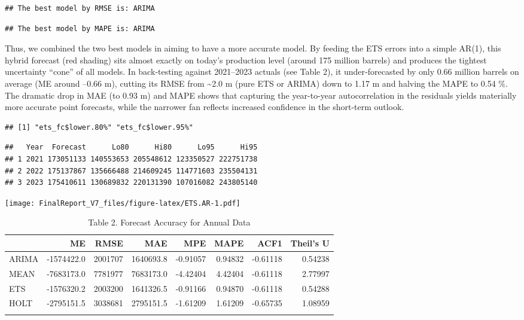 \documentclass[
]{article}
\begin{document}
\begin{verbatim}
## The best model by RMSE is: ARIMA
\end{verbatim}

\begin{verbatim}
## The best model by MAPE is: ARIMA
\end{verbatim}

Thus, we combined the two best models in aiming to have a more accurate
model. By feeding the ETS errors into a simple AR(1), this hybrid
forecast (red shading) sits almost exactly on today's production level
(around 175 million barrels) and produces the tightest uncertainty
``cone'' of all models. In back‐testing against 2021--2023 actuals (see
Table 2), it under‐forecasted by only 0.66 million barrels on average
(ME around --0.66 m), cutting its RMSE from \textasciitilde2.0 m (pure
ETS or ARIMA) down to 1.17 m and halving the MAPE to 0.54 \%. The
dramatic drop in MAE (to 0.93 m) and MAPE shows that capturing the
year-to-year autocorrelation in the residuals yields materially more
accurate point forecasts, while the narrower fan reflects increased
confidence in the short‐term outlook.

\begin{verbatim}
## [1] "ets_fc$lower.80%" "ets_fc$lower.95%"
\end{verbatim}

\begin{verbatim}
##   Year  Forecast      Lo80      Hi80      Lo95      Hi95
## 1 2021 173051133 140553653 205548612 123350527 222751738
## 2 2022 175137867 135666488 214609245 114771603 235504131
## 3 2023 175410611 130689832 220131390 107016082 243805140
\end{verbatim}

\texttt{[image: FinalReport\_V7\_files/figure-latex/ETS.AR-1.pdf]}

\begin{table}
\centering\centering
\caption{\label{tab:Accuracy2}Table 2. Forecast Accuracy for Annual Data}
\centering
\begin{tabular}[t]{l|r|r|r|r|r|r|r}
\hline
  & ME & RMSE & MAE & MPE & MAPE & ACF1 & Theil's U\\
\hline
ARIMA & -1574422.0 & 2001707 & 1640693.8 & -0.91057 & 0.94832 & -0.61118 & 0.54238\\
\hline
MEAN & -7683173.0 & 7781977 & 7683173.0 & -4.42404 & 4.42404 & -0.61118 & 2.77997\\
\hline
ETS & -1576320.2 & 2003200 & 1641326.5 & -0.91166 & 0.94870 & -0.61118 & 0.54288\\
\hline
HOLT & -2795151.5 & 3038681 & 2795151.5 & -1.61209 & 1.61209 & -0.65735 & 1.08959\\
\hline
\cellcolor{gray!10}{Hybrid ETS \& AR(1)} & \cellcolor{gray!10}{-657903.9} & \cellcolor{gray!10}{1171499} & \cellcolor{gray!10}{932078.9} & \cellcolor{gray!10}{-0.38062} & \cellcolor{gray!10}{0.53680} & \cellcolor{gray!10}{-0.40555} & \cellcolor{gray!10}{0.54320}\\
\hline
\end{tabular}
\end{table}
\end{document}
